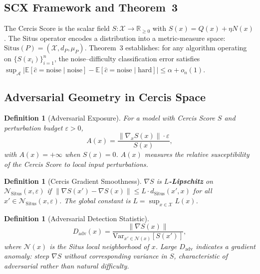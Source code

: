 \documentclass[12pt,a4paper]{article}
\newtheorem{definition}[theorem]{Definition}
\newcommand{\R}{\mathbb{R}}
\newcommand{\E}{\mathbb{E}}
\newcommand{\cX}{\mathcal{X}}
\newcommand{\cN}{\mathcal{N}}
\newcommand{\cA}{\mathcal{A}}
\newcommand{\Situs}{\mathrm{Situs}}
\begin{document}
\subsection{SCX Framework and Theorem~3}

The Cercis Score is the scalar field $S: \cX \to \R_{\geq 0}$ with
$S(x) = Q(x) + \eta N(x)$.  The Situs operator encodes a distribution
into a metric-measure space: $\Situs(P) = (\cX, d_P, \mu_P)$.  Theorem~3
establishes: for any algorithm operating on $\{S(x_i)\}_{i=1}^n$, the
noise--difficulty classification error satisfies
$\sup_{\cA} |\E[\hat{c} = \text{noise} \mid \text{noise}] -
\E[\hat{c} = \text{noise} \mid \text{hard}]| \leq \alpha + o_n(1)$.

\subsection{Adversarial Geometry in Cercis Space}

\begin{definition}[Adversarial Exposure]
\label{def:A}
For a model with Cercis Score $S$ and perturbation budget $\varepsilon > 0$,
\begin{equation}\label{eq:A-def}
    A(x) = \frac{\|\nabla_x S(x)\| \cdot \varepsilon}{S(x)},
\end{equation}
with $A(x) = +\infty$ when $S(x) = 0$.  $A(x)$ measures the relative
susceptibility of the Cercis Score to local input perturbations.
\end{definition}

\begin{definition}[Cercis Gradient Smoothness]
\label{def:lipschitz}
$\nabla S$ is \textbf{$L$-Lipschitz} on $\cN_{\Situs}(x, \varepsilon)$ if
$\|\nabla S(x') - \nabla S(x)\| \leq L \cdot d_{\Situs}(x', x)$ for all
$x' \in \cN_{\Situs}(x, \varepsilon)$.  The global constant is
$L = \sup_{x \in \cX} L(x)$.
\end{definition}

\begin{definition}[Adversarial Detection Statistic]
\label{def:D-adv}
\begin{equation}\label{eq:D-adv}
    D_{\mathrm{adv}}(x) =
    \frac{\|\nabla S(x)\|}
         {\mathrm{Var}_{x' \in \mathcal{N}(x)}[S(x')]},
\end{equation}
where $\mathcal{N}(x)$ is the Situs local neighborhood of $x$.  Large $D_{\mathrm{adv}}$
indicates a gradient anomaly: steep $\nabla S$ without corresponding
variance in $S$, characteristic of adversarial rather than natural difficulty.
\end{definition}
\end{document}

